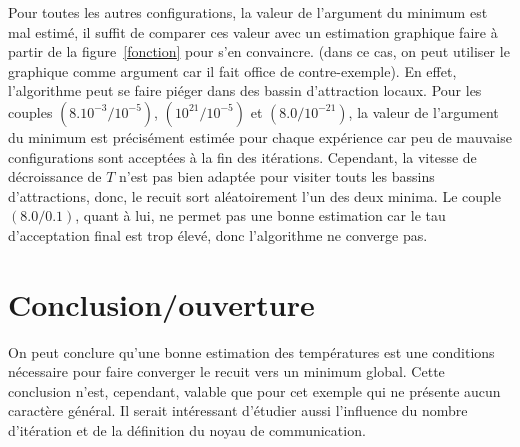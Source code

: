 \documentclass[10pt,a4paper]{article}
\begin{document}
Pour toutes les autres configurations, la valeur de l'argument du minimum est mal estimé, il suffit de comparer ces valeur avec un estimation graphique faire à partir de la figure~\ref{fonction} pour s'en convaincre. (dans ce cas, on peut utiliser le graphique comme argument car il fait office de contre-exemple). En effet, l'algorithme peut se faire piéger dans des bassin d'attraction locaux. Pour les couples $(8.10^{-3}/10^{-5})$,  $(10^{21}/10^{-5})$ et $(8.0/10^{-21})$, la valeur de l'argument du minimum est précisément estimée pour chaque expérience car peu de mauvaise configurations sont acceptées à la fin des itérations. Cependant, la vitesse de décroissance de $T$ n'est pas bien adaptée pour visiter touts les bassins d'attractions, donc, le recuit sort aléatoirement l'un des deux minima. Le couple $(8.0/0.1)$, quant à lui, ne permet pas une bonne estimation car le tau d'acceptation final est trop élevé, donc l'algorithme ne converge pas.


\section{Conclusion/ouverture}
On peut conclure qu'une bonne estimation des températures est une conditions nécessaire pour faire converger le recuit vers un minimum global. Cette conclusion n'est, cependant, valable que pour cet exemple qui ne présente aucun caractère général. Il serait intéressant d’étudier aussi l'influence du nombre d’itération et de la définition du noyau de communication.
\end{document}
